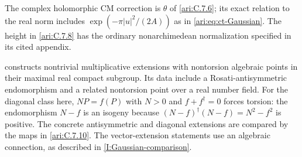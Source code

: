 \begin{remark}
\hypertarget{tag-IA14}{}\label{I:CM-compact-comparison}

The complex holomorphic CM correction is $\theta$ of
\cref{ari:C.7.6}; its exact relation to the real norm includes
$\exp(-\pi|u|^2/(2A))$ as in \eqref{ari:eq:ct-Gaussian}.
The height in \cref{ari:C.7.8} has the ordinary nonarchimedean
normalization specified in its cited appendix.

\citet[Theorem~2.1, p.~147]{bertrand1995} constructs nontrivial
multiplicative extensions with nontorsion algebraic points in
their maximal real compact subgroup. Its data include a
Rosati-antisymmetric endomorphism and a related nontorsion
point over a real number field.
For the diagonal class here, $NP=f(P)$ with $N>0$ and
$f+f^\dagger=0$ forces torsion: the endomorphism $N-f$ is an
isogeny because
$(N-f)^\dagger(N-f)=N^2-f^2$ is positive.
The concrete antisymmetric and diagonal extensions are
compared by the maps in \cref{ari:C.7.10}.
The vector-extension statements
\cite[Theorem~3.1, p.~150]{bertrand1995}\cite[Theorem~3.1.2, p.~386]{bost2009}
use an algebraic connection, as described in
\cref{I:Gaussian-comparison}.
\end{remark}
